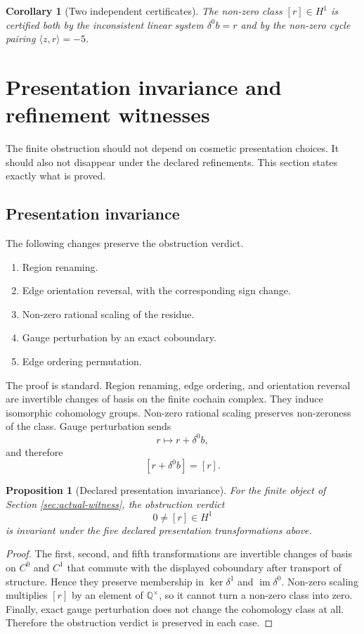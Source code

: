 \documentclass[11pt]{article}
\newtheorem{proposition}[theorem]{Proposition}
\newtheorem{corollary}[theorem]{Corollary}
\newcommand{\im}{\operatorname{im}}
\newcommand{\Q}{\mathbb{Q}}
\begin{document}
\begin{corollary}[Two independent certificates]
The non-zero class \([r]\in H^1\) is certified both by the inconsistent linear system \(\delta^0b=r\) and by the non-zero cycle pairing \(\langle z,r\rangle=-5\).
\end{corollary}

\section{Presentation invariance and refinement witnesses}\label{sec:invariance-refinement}

The finite obstruction should not depend on cosmetic presentation choices. It should also not disappear under the declared refinements. This section states exactly what is proved.

\subsection{Presentation invariance}

The following changes preserve the obstruction verdict.

\begin{enumerate}[label=(\arabic*)]
\item Region renaming.
\item Edge orientation reversal, with the corresponding sign change.
\item Non-zero rational scaling of the residue.
\item Gauge perturbation by an exact coboundary.
\item Edge ordering permutation.
\end{enumerate}

The proof is standard. Region renaming, edge ordering, and orientation reversal are invertible changes of basis on the finite cochain complex. They induce isomorphic cohomology groups. Non-zero rational scaling preserves non-zeroness of the class. Gauge perturbation sends
\[
r\longmapsto r+\delta^0b,
\]
and therefore
\[
[r+\delta^0b]=[r].
\]

\begin{proposition}[Declared presentation invariance]
For the finite object of Section \ref{sec:actual-witness}, the obstruction verdict
\[
0\neq [r]\in H^1
\]
is invariant under the five declared presentation transformations above.
\end{proposition}

\begin{proof}
The first, second, and fifth transformations are invertible changes of basis on \(C^0\) and \(C^1\) that commute with the displayed coboundary after transport of structure. Hence they preserve membership in \(\ker\delta^1\) and \(\im\delta^0\). Non-zero scaling multiplies \([r]\) by an element of \(\Q^\times\), so it cannot turn a non-zero class into zero. Finally, exact gauge perturbation does not change the cohomology class at all. Therefore the obstruction verdict is preserved in each case.
\end{proof}
\end{document}
